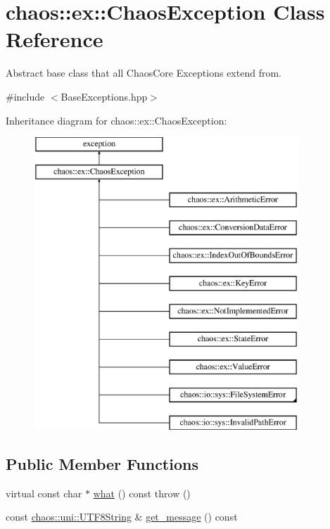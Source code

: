 \hypertarget{classchaos_1_1ex_1_1_chaos_exception}{}\section{chaos\+:\+:ex\+:\+:Chaos\+Exception Class Reference}
\label{classchaos_1_1ex_1_1_chaos_exception}


Abstract base class that all Chaos\+Core Exceptions extend from.  




{\ttfamily \#include $<$Base\+Exceptions.\+hpp$>$}

Inheritance diagram for chaos\+:\+:ex\+:\+:Chaos\+Exception\+:\begin{figure}[H]
\begin{center}
\leavevmode
\includegraphics[height=11.000000cm]{classchaos_1_1ex_1_1_chaos_exception}
\end{center}
\end{figure}
\subsection*{Public Member Functions}
\begin{DoxyCompactItemize}
\item 
virtual const char $\ast$ \hyperlink{classchaos_1_1ex_1_1_chaos_exception_a5266c5ba1e7b6ab2bbfcb2a6c01fafea}{what} () const   throw ()
\item 
const \hyperlink{classchaos_1_1uni_1_1_u_t_f8_string}{chaos\+::uni\+::\+U\+T\+F8\+String} \& \hyperlink{classchaos_1_1ex_1_1_chaos_exception_a03cf7cf992d411770c7cefa925c84f4f}{get\+\_\+message} () const 
\end{DoxyCompactItemize}
